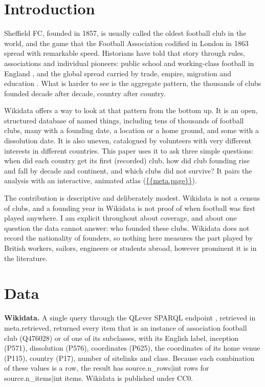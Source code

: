 \documentclass[11pt,a4paper]{article}
\begin{document}
\section{Introduction}
Sheffield FC, founded in 1857, is usually called the oldest football club in the world, and the game that the Football Association codified in London in 1863 spread with remarkable speed. Historians have told that story through rules, associations and individual pioneers: public school and working-class football in England \citep{harvey}, and the global spread carried by trade, empire, migration and education \citep{goldblatt,giulianotti}. What is harder to see is the aggregate pattern, the thousands of clubs founded decade after decade, country after country.

Wikidata \citep{wikidata} offers a way to look at that pattern from the bottom up. It is an open, structured database of named things, including tens of thousands of football clubs, many with a founding date, a location or a home ground, and some with a dissolution date. It is also uneven, catalogued by volunteers with very different interests in different countries. This paper uses it to ask three simple questions: when did each country get its first (recorded) club, how did club founding rise and fall by decade and continent, and which clubs did not survive? It pairs the analysis with an interactive, animated atlas (\url{{{meta.page}}}).

The contribution is descriptive and deliberately modest. Wikidata is not a census of clubs, and a founding year in Wikidata is not proof of when football was first played anywhere. I am explicit throughout about coverage, and about one question the data cannot answer: who founded these clubs. Wikidata does not record the nationality of founders, so nothing here measures the part played by British workers, sailors, engineers or students abroad, however prominent it is in the literature.

\section{Data}
\textbf{Wikidata.} A single query through the QLever SPARQL endpoint \citep{qlever}, retrieved in {{meta.retrieved}}, returned every item that is an instance of association football club (Q476028) or of one of its subclasses, with its English label, inception (P571), dissolution (P576), coordinates (P625), the coordinates of its home venue (P115), country (P17), number of sitelinks and class. Because each combination of these values is a row, the result has {{source.n_rows|int}} rows for {{source.n_items|int}} items. Wikidata is published under CC0.
\end{document}
